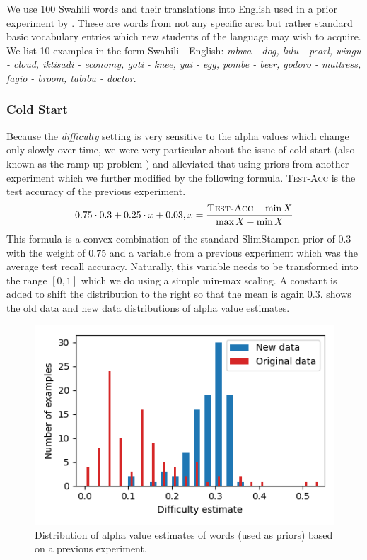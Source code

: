 We use 100 Swahili words and their translations into English used in a prior experiment by \cite{nelson1994norms}.
These are words from not any specific area but rather standard basic vocabulary entries which new students of the language may wish to acquire.
We list 10 examples in the form Swahili - English:
\emph{mbwa - dog, lulu - pearl, wingu - cloud, iktisadi - economy, goti - knee, yai - egg, pombe - beer, godoro - mattress, fagio - broom, tabibu - doctor}.

\subsubsection{Cold Start}

Because the \emph{difficulty} setting is very sensitive to the alpha values which change only slowly over time, we were very particular about the issue of cold start (also known as the ramp-up problem \cite{konstan1998borchers}) and alleviated that using priors from another experiment \cite{nelson1994norms} which we further modified by the following formula.
\textsc{Test-Acc} is the test accuracy of the previous experiment.
$$
0.75 \cdot 0.3 + 0.25 \cdot x + 0.03, x = \frac{\textsc{Test-Acc} - \min X}{\max X - \min X}
$$
This formula is a convex combination of the standard SlimStampen prior of $0.3$ with the weight of $0.75$ and a variable from a previous experiment \cite{nelson1994norms} which was the average test recall accuracy.
Naturally, this variable needs to be transformed into the range $[0,1]$ which we do using a simple min-max scaling.
A constant is added to shift the distribution to the right so that the mean is again $0.3$.
 shows the old data and new data distributions of alpha value estimates.

\begin{figure}[ht]
\includegraphics[width=\linewidth]{img/cold_start.png}
\caption{Distribution of alpha value estimates of words (used as priors) based on a previous experiment.}
\label{fig:cold_start}
\end{figure}

